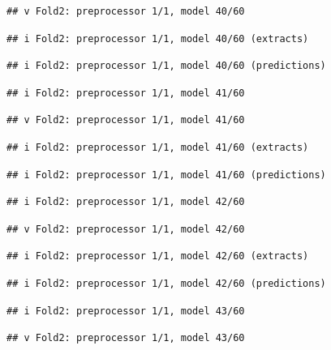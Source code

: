 \documentclass[
]{article}
\begin{document}
\begin{verbatim}
## v Fold2: preprocessor 1/1, model 40/60
\end{verbatim}

\begin{verbatim}
## i Fold2: preprocessor 1/1, model 40/60 (extracts)
\end{verbatim}

\begin{verbatim}
## i Fold2: preprocessor 1/1, model 40/60 (predictions)
\end{verbatim}

\begin{verbatim}
## i Fold2: preprocessor 1/1, model 41/60
\end{verbatim}

\begin{verbatim}
## v Fold2: preprocessor 1/1, model 41/60
\end{verbatim}

\begin{verbatim}
## i Fold2: preprocessor 1/1, model 41/60 (extracts)
\end{verbatim}

\begin{verbatim}
## i Fold2: preprocessor 1/1, model 41/60 (predictions)
\end{verbatim}

\begin{verbatim}
## i Fold2: preprocessor 1/1, model 42/60
\end{verbatim}

\begin{verbatim}
## v Fold2: preprocessor 1/1, model 42/60
\end{verbatim}

\begin{verbatim}
## i Fold2: preprocessor 1/1, model 42/60 (extracts)
\end{verbatim}

\begin{verbatim}
## i Fold2: preprocessor 1/1, model 42/60 (predictions)
\end{verbatim}

\begin{verbatim}
## i Fold2: preprocessor 1/1, model 43/60
\end{verbatim}

\begin{verbatim}
## v Fold2: preprocessor 1/1, model 43/60
\end{verbatim}
\end{document}
